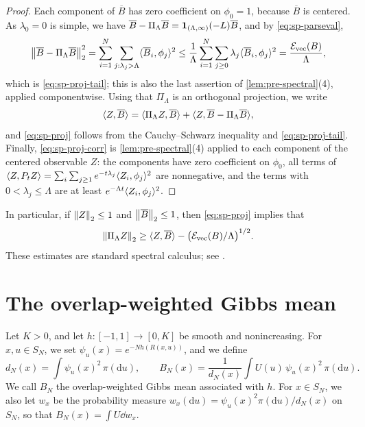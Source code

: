 \begin{proof}
Each component of $\overline B$ has zero coefficient on $\phi_0=1$, because $\overline B$ is centered. As $\lambda_0=0$ is simple, we have $\overline B-\Pi_\Lambda\overline B=\mathbf 1_{(\Lambda,\infty)}(-L)\overline B$, and by \eqref{eq:sp-parseval},
\[
\left\lVert\overline B-\Pi_\Lambda\overline B\right\rVert_2^2=\sum_{i=1}^N\sum_{j:\lambda_j>\Lambda}\langle\overline B_i,\phi_j\rangle^2
\le\frac1\Lambda\sum_{i=1}^N\sum_{j\ge0}\lambda_j\langle\overline B_i,\phi_j\rangle^2=\frac{\mathcal E_{\rm vec}(B)}\Lambda,
\]
which is \eqref{eq:sp-proj-tail}; this is also the last assertion of \cref{lem:pre-spectral}(4), applied componentwise. Using that $\Pi_\Lambda$ is an orthogonal projection, we write
\[
\langle Z,\overline B\rangle=\langle\Pi_\Lambda Z,\overline B\rangle+\langle Z,\overline B-\Pi_\Lambda\overline B\rangle,
\]
and \eqref{eq:sp-proj} follows from the Cauchy--Schwarz inequality and \eqref{eq:sp-proj-tail}. Finally, \eqref{eq:sp-proj-corr} is \cref{lem:pre-spectral}(4) applied to each component of the centered observable $Z$: the components have zero coefficient on $\phi_0$, all terms of $\langle Z,P_tZ\rangle=\sum_i\sum_{j\ge1}e^{-t\lambda_j}\langle Z_i,\phi_j\rangle^2$ are nonnegative, and the terms with $0<\lambda_j\le\Lambda$ are at least $e^{-\Lambda t}\langle Z_i,\phi_j\rangle^2$.
\end{proof}

In particular, if $\left\lVert Z\right\rVert_2\le1$ and $\left\lVert\overline B\right\rVert_2\le1$, then \eqref{eq:sp-proj} implies that
\[
\left\lVert\Pi_\Lambda Z\right\rVert_2\ge\langle Z,\overline B\rangle-\big(\mathcal E_{\rm vec}(B)/\Lambda\big)^{1/2}.
\]
These estimates are standard spectral calculus; see \cite[Section~1.7]{BakryGentilLedoux2014}.

\section{The overlap-weighted Gibbs mean}\label{sec:sp-barycenter}

\begin{definition}\label{def:sp-barycenter}
Let $K>0$, and let $h\colon[-1,1]\to[0,K]$ be smooth and nonincreasing. For $x,u\in S_N$, we set $\psi_u(x)=e^{-Nh(R(x,u))}$, and we define
\[
d_N(x)=\int\psi_u(x)^2\,\pi(\mathrm du),
\qquad
B_N(x)=\frac1{d_N(x)}\int U(u)\,\psi_u(x)^2\,\pi(\mathrm du).
\]
We call $B_N$ the overlap-weighted Gibbs mean associated with $h$. For $x\in S_N$, we also let $w_x$ be the probability measure $w_x(\mathrm du)=\psi_u(x)^2\pi(\mathrm du)/d_N(x)$ on $S_N$, so that $B_N(x)=\int U\dd w_x$.
\end{definition}

